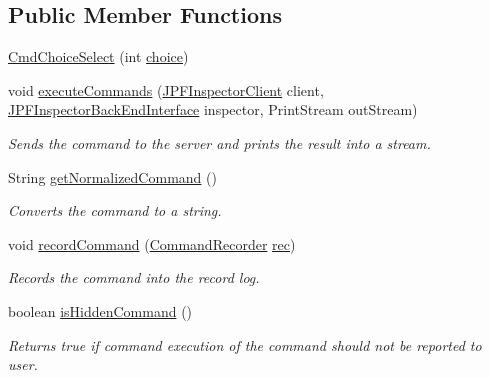 \subsection*{Public Member Functions}
\begin{DoxyCompactItemize}
\item 
\hyperlink{classgov_1_1nasa_1_1jpf_1_1inspector_1_1client_1_1commands_1_1_cmd_choice_select_aa15ffbfa11ba43922f72ad0fc0b3b8b8}{Cmd\+Choice\+Select} (int \hyperlink{classgov_1_1nasa_1_1jpf_1_1inspector_1_1client_1_1commands_1_1_cmd_choice_select_ae6fd217c673bc63e67a1b7c54ea78376}{choice})
\item 
void \hyperlink{classgov_1_1nasa_1_1jpf_1_1inspector_1_1client_1_1commands_1_1_cmd_choice_select_a278b6868991a5af0d866c68586bf5962}{execute\+Commands} (\hyperlink{classgov_1_1nasa_1_1jpf_1_1inspector_1_1client_1_1_j_p_f_inspector_client}{J\+P\+F\+Inspector\+Client} client, \hyperlink{interfacegov_1_1nasa_1_1jpf_1_1inspector_1_1interfaces_1_1_j_p_f_inspector_back_end_interface}{J\+P\+F\+Inspector\+Back\+End\+Interface} inspector, Print\+Stream out\+Stream)
\begin{DoxyCompactList}\small\item\em Sends the command to the server and prints the result into a stream. \end{DoxyCompactList}\item 
String \hyperlink{classgov_1_1nasa_1_1jpf_1_1inspector_1_1client_1_1commands_1_1_cmd_choice_select_adb05f86201860488657d95530101553f}{get\+Normalized\+Command} ()
\begin{DoxyCompactList}\small\item\em Converts the command to a string. \end{DoxyCompactList}\item 
void \hyperlink{classgov_1_1nasa_1_1jpf_1_1inspector_1_1client_1_1_client_command_ae0670332ec750bc5b9016d0b04d8adfe}{record\+Command} (\hyperlink{classgov_1_1nasa_1_1jpf_1_1inspector_1_1client_1_1_command_recorder}{Command\+Recorder} \hyperlink{classgov_1_1nasa_1_1jpf_1_1inspector_1_1client_1_1_client_command_af4246f2427035c72a6af45a2c61361f7}{rec})
\begin{DoxyCompactList}\small\item\em Records the command into the record log. \end{DoxyCompactList}\item 
boolean \hyperlink{classgov_1_1nasa_1_1jpf_1_1inspector_1_1client_1_1_client_command_afb09c400c64e2d8e01059b91ff847761}{is\+Hidden\+Command} ()
\begin{DoxyCompactList}\small\item\em Returns true if command execution of the command should not be reported to user. \end{DoxyCompactList}\end{DoxyCompactItemize}
